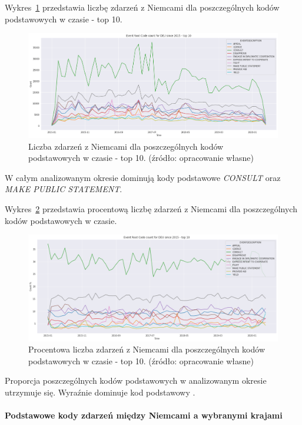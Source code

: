 \documentclass[11pt]{report}
\begin{document}
    Wykres~\ref{fig:DEUPERCinTIME} przedstawia liczbę zdarzeń z Niemcami dla poszczególnych kodów podstawowych w czasie - top 10.
    \begin{figure}[!htp]
        \centering
        \includegraphics[width=\linewidth]{fig/DEU/DEUERCinTIME.png}
        \caption{Liczba zdarzeń z Niemcami dla poszczególnych kodów podstawowych w czasie - top 10. (źródło: opracowanie własne)}
        \label{fig:DEUPERCinTIME}
    \end{figure}
    W całym analizowanym okresie dominują kody podstawowe \textit{CONSULT} oraz \textit{MAKE PUBLIC STATEMENT}.

    Wykres~\ref{fig:DEUPERCpercinTIME} przedstawia procentową liczbę zdarzeń z Niemcami dla poszczególnych kodów podstawowych w czasie.
    \begin{figure}[!htp]
        \centering
        \includegraphics[width=\linewidth]{fig/DEU/DEUERCpercinTIME.png}
        \caption{Procentowa liczba zdarzeń z Niemcami dla poszczególnych kodów podstawowych w czasie - top 10. (źródło: opracowanie własne)}
        \label{fig:DEUPERCpercinTIME}
    \end{figure}
    Proporcja poszczególnych kodów podstawowych w analizowanym okresie utrzymuje się.
    Wyraźnie dominuje kod podstawowy .

    \paragraph{Podstawowe kody zdarzeń między Niemcami a wybranymi krajami}
\end{document}
